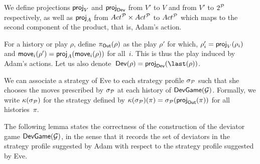 We define projections \(\textsf{proj}_{V}\) and \(\textsf{proj}_{\textsf{Dev}}\) from \(V'\) to
\(V\) and from \(V'\) to \(2^{\mathcal{P}}\) respectively, as well as
\(\textsf{proj}_{A}\) from \(Act^{\mathcal{P}} \times Act^{\mathcal{P}}\) to \(Act^{\mathcal{P}}\) which
maps to the second component of the product, that is, Adam's action.

For a history or play \(\rho\), define \(\pi_{\textsf{Out}}(\rho)\) as the play
\(\rho'\) for which, \(\rho'_i = \textsf{proj}_V(\rho_i)\) and
\(\textsf{move}_i(\rho') = \textsf{proj}_{A}(\textsf{move}_i(\rho))\) for all~$i$. This is thus the play
induced by Adam's actions.
Let us also denote~$\Dev(\rho) = \proj_{\Dev}(\last(\rho))$.

We can associate a strategy of Eve to each strategy profile
\(\sigma_{\mathcal{P}}\) such that she chooses the moves prescribed by
\(\sigma_{\mathcal{P}}\) at each history of \(\textsf{DevGame}(\mathcal{G})\). Formally, we write
\(\kappa(\sigma_{\mathcal{P}})\) for the strategy defined by
\(\kappa(\sigma_{\mathcal{P}})(\pi) = \sigma_{\mathcal{P}}(\textsf{proj}_{\textsf{Out}}(\pi))\) for all histories~$\pi$.

The following lemma states the correctness of the construction of the
deviator game \(\textsf{DevGame}(\mathcal{G})\), in the sense that it records the set of
deviators in the strategy profile suggested by Adam with respect to the
strategy profile suggested by Eve.

